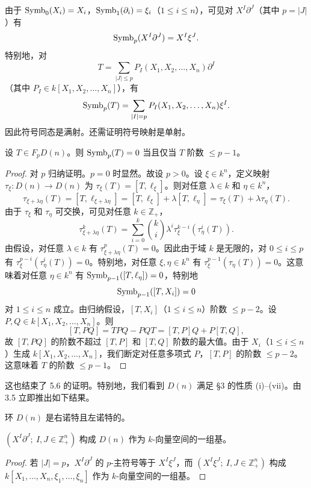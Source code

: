 由于 $\operatorname{Symb}_0(X_i)=X_i$，$\operatorname{Symb}_1(\partial_i)=\xi_i$（$1\le i\le n$），可见对 $X^I\partial^J$（其中 $p=|J|$）有
$$\operatorname{Symb}_p(X^I\partial^J)=X^I\xi^J.$$
特别地，对
$$T=\sum_{|J|\le p}P_I(X_1,X_2,\dots,X_n)\partial^I$$
（其中 $P_I\in k[X_1,X_2,\dots,X_n]$），有
$$\operatorname{Symb}_p(T)=\sum_{|I|=p}P_I(X_1,X_2,\dots,X_n)\xi^I.$$
因此符号同态是满射。还需证明符号映射是单射。

\begin{lemma}
设 $T\in F_p D(n)$。则 $\operatorname{Symb}_p(T)=0$ 当且仅当 $T$ 阶数 $\le p-1$。
\end{lemma}

\begin{proof}
对 $p$ 归纳证明。$p=0$ 时显然。故设 $p>0$。设 $\xi\in k^n$，定义映射 $\tau_\xi:D(n)\to D(n)$ 为 $\tau_\xi(T)=[T,\ell_\xi]$。则对任意 $\lambda\in k$ 和 $\eta\in k^n$，
$$\tau_{\xi+\lambda\eta}(T)=[T,\ell_{\xi+\lambda\eta}]=[T,\ell_\xi]+\lambda[T,\ell_\eta]=\tau_\xi(T)+\lambda\tau_\eta(T).$$
由于 $\tau_\xi$ 和 $\tau_\eta$ 可交换，可见对任意 $k\in\mathbb{Z}_+$，
$$\tau_{\xi+\lambda\eta}^k(T)=\sum_{i=0}^k\binom{k}{i}\lambda^i\tau_\xi^{k-i}(\tau_\eta^i(T)).$$
由假设，对任意 $\lambda\in k$ 有 $\tau_{\xi+\lambda\eta}^p(T)=0$。因此由于域 $k$ 是无限的，对 $0\le i\le p$ 有 $\tau_\xi^{p-i}(\tau_\eta^i(T))=0$。特别地，对任意 $\xi,\eta\in k^n$ 有 $\tau_\xi^{p-1}(\tau_\eta(T))=0$。这意味着对任意 $\eta\in k^n$ 有 $\operatorname{Symb}_{p-1}([T,\ell_\eta])=0$，特别地
$$\operatorname{Symb}_{p-1}([T,X_i])=0$$
对 $1\le i\le n$ 成立。由归纳假设，$[T,X_i]$（$1\le i\le n$）阶数 $\le p-2$。设 $P,Q\in k[X_1,X_2,\dots,X_n]$。则
$$[T,PQ]=TPQ-PQT=[T,P]Q+P[T,Q],$$
故 $[T,PQ]$ 的阶数不超过 $[T,P]$ 和 $[T,Q]$ 阶数的最大值。由于 $X_i$（$1\le i\le n$）生成 $k[X_1,X_2,\dots,X_n]$，我们断定对任意多项式 $P$，$[T,P]$ 的阶数 $\le p-2$。这意味着 $T$ 的阶数 $\le p-1$。
\end{proof}

这也结束了 5.6 的证明。特别地，我们看到 $D(n)$ 满足 §3 的性质 (i)--(vii)。由 3.5 立即推出如下结果。

\begin{theorem}
环 $D(n)$ 是右诺特且左诺特的。
\end{theorem}

\begin{corollary}
$(X^I\partial^J;\ I,J\in\mathbb{Z}_+^n)$ 构成 $D(n)$ 作为 $k$-向量空间的一组基。
\end{corollary}

\begin{proof}
若 $|J|=p$，$X^I\partial^J$ 的 $p$-主符号等于 $X^I\xi^J$，而 $(X^I\xi^J;\ I,J\in\mathbb{Z}_+^n)$ 构成 $k[X_1,\dots,X_n,\xi_1,\dots,\xi_n]$ 作为 $k$-向量空间的一组基。
\end{proof}


